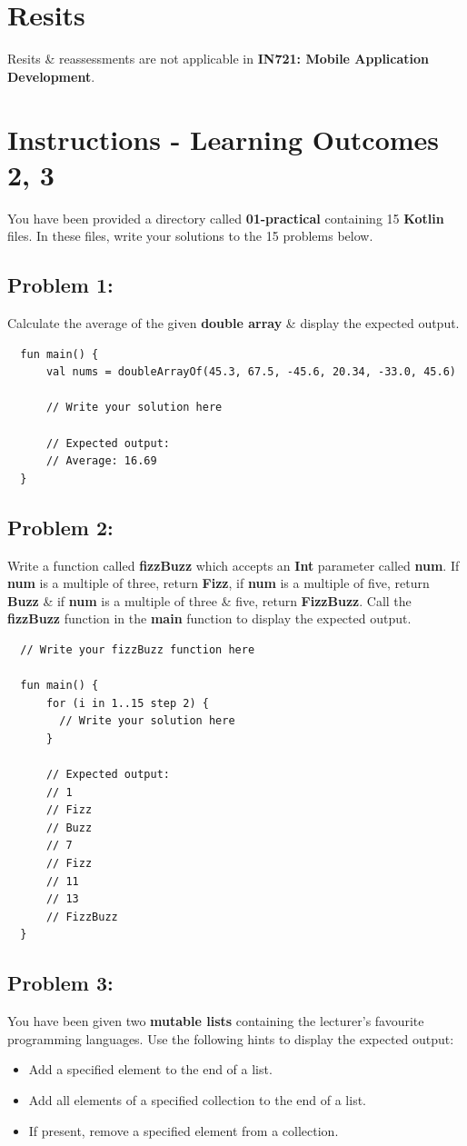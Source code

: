 \documentclass{article}
\begin{document}
\section*{Resits}
Resits \& reassessments are not applicable in \textbf{IN721: Mobile Application Development}.

\section*{Instructions - Learning Outcomes 2, 3}
You have been provided a directory called \textbf{01-practical} containing 15 \textbf{Kotlin} files. In these files, write your solutions to the 15 problems below. 

\subsection*{Problem 1:} 
Calculate the average of the given \textbf{double array} \& display the expected output.

\begin{verbatim}
  fun main() {
      val nums = doubleArrayOf(45.3, 67.5, -45.6, 20.34, -33.0, 45.6)

      // Write your solution here

      // Expected output:
      // Average: 16.69 
  }
\end{verbatim}

\subsection*{Problem 2:}
Write a function called \textbf{fizzBuzz} which accepts an \textbf{Int} parameter called \textbf{num}. If \textbf{num} is a multiple of three, return \textbf{Fizz}, if \textbf{num} is a multiple of five, return \textbf{Buzz} \& if \textbf{num} is a multiple of three \& five, return \textbf{FizzBuzz}. Call the \textbf{fizzBuzz} function in the \textbf{main} function to display the expected output.

\begin{verbatim}
  // Write your fizzBuzz function here
  
  fun main() {
      for (i in 1..15 step 2) {
        // Write your solution here
      }

      // Expected output:
      // 1
      // Fizz
      // Buzz
      // 7
      // Fizz
      // 11
      // 13
      // FizzBuzz
  }
\end{verbatim}

\subsection*{Problem 3:} You have been given two \textbf{mutable lists} containing the lecturer's favourite programming languages. Use the following hints to display the expected output:
\begin{itemize}
  \item Add a specified element to the end of a list.
  \item Add all elements of a specified collection to the end of a list.
  \item If present, remove a specified element from a collection.
\end{itemize}
\end{document}
